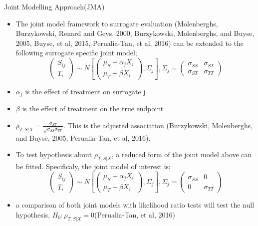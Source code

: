 \documentclass[a4paper,9pt]{beamer}\usepackage[]{graphicx}\usepackage[]{color}
\begin{document}
\begin{frame}{Joint Modelling Approach(JMA)}
\begin{itemize}
\item The joint model framework to surrogate evaluation (Molenberghs, Burzykowski, Renard and Geys, 2000, Burzykowski, Molenberghs, and Buyse, 2005,  Buyse, et al, 2015, Perualia-Tan, et al, 2016) can be extended to the following surrogate specific joint model;
$$ \left( \begin{array}{c}
S_{ij} \\
T_{i}
\end{array} \right) \sim N\left[ \left( \begin{array}{c}
\mu_{S} + \alpha_jX_i  \\
\mu_{T} + \beta X_i
\end{array}
\right), \Sigma_j \right], \Sigma_j = \left( \begin{array}{cc}
\sigma_{SS} & \sigma_{ST}\\
\sigma_{ST} & \sigma_{TT}
\end{array}\right)$$

\item $\alpha_j$ is the effect of treatment on surrogate j 
\item $\beta$ is the effect of treatment on the true endpoint
\item $\rho_{T,S|X} = \frac{\sigma_{ST}}{\sqrt{\sigma_{SS} \sigma_{TT} }}$. This is the adjusted association (Burzykowski, Molenberghs, and Buyse, 2005, Perualia-Tan, et al, 2016).
\item To test hypothesis about $\rho_{T,S|X}$, a reduced form of the joint model above can be fitted. Specificaly, the joint model of interest is;
$$ \left( \begin{array}{c}
S_{ij} \\
T_{i}
\end{array} \right) \sim N\left[ \left( \begin{array}{c}
\mu_{S} + \alpha_jX_i  \\
\mu_{T} + \beta X_i
\end{array}
\right), \Sigma_j \right], \Sigma_j = \left( \begin{array}{cc}
\sigma_{SS} & 0\\
0 & \sigma_{TT}
\end{array}\right)$$
\item a comparison of both joint models with likelihood ratio tests will test the null hypothesis, $H_0: \rho_{T,S|X} = 0$(Perualia-Tan, et al, 2016)
\end{itemize}

\end{frame}
\end{document}
